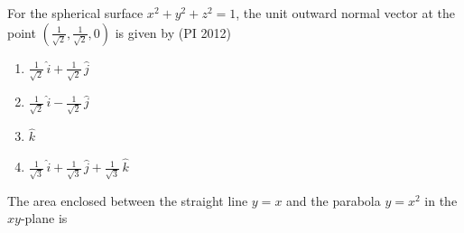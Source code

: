   \item For the spherical surface $x^2 + y^2 + z^2 = 1$, the unit outward normal vector at the point $\left(\tfrac{1}{\sqrt{2}}, \tfrac{1}{\sqrt{2}}, 0\right)$ is given by
  \hfill{(PI 2012)}
  \begin{multicols}{4}
  \begin{enumerate}
    \item $\tfrac{1}{\sqrt{2}} \, \hat{i} + \tfrac{1}{\sqrt{2}} \, \hat{j}$
    \item $\tfrac{1}{\sqrt{2}} \, \hat{i} - \tfrac{1}{\sqrt{2}} \, \hat{j}$
    \item $\hat{k}$
    \item $\tfrac{1}{\sqrt{3}} \, \hat{i} + \tfrac{1}{\sqrt{3}} \, \hat{j} + \tfrac{1}{\sqrt{3}} \, \hat{k}$
  \end{enumerate}
\end{multicols}
  \item The area enclosed between the straight line $y=x$ and the parabola $y=x^2$ in the $xy$-plane is

